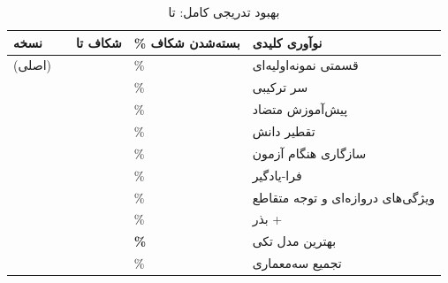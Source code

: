 \begin{table}[htbp]
\centering
\caption{بهبود تدریجی کامل:  تا }
\footnotesize
\setlength{\tabcolsep}{1.8pt}
\begin{tabularx}{\linewidth}{@{}R{3.5cm}C{1.25cm}C{1.45cm}C{1.75cm}Y@{}}
\toprule
نسخه &  & شکاف تا  & \% بسته‌شدن شکاف & نوآوری کلیدی \\
\midrule
{} (اصلی) &  &  & \% & قسمتی نمونه‌اولیه‌ای \\
 &  &  & \% & سر ترکیبی \\
 &  &  & \% & پیش‌آموزش متضاد \\
 &  &  & \% & تقطیر دانش  \\
 &  &  & \% & سازگاری هنگام آزمون \\
 &  &  & \% &  فرا-یادگیر \\
\newline{} &  &  & \% & ویژگی‌های دروازه‌ای و توجه متقاطع \\
 &  &  & \% &   بذر +  \\
 & \textbf{} & \textbf{} & \textbf{\%} & بهترین مدل تکی \\
\newline{} &  &  & \% & تجمیع سه‌معماری \\
\bottomrule
\end{tabularx}
\label{tab:progressive_full}
\end{table}

